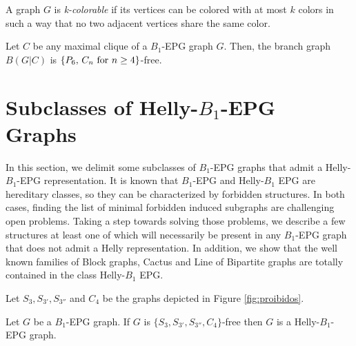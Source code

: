 A graph $G$ is \textit{k-colorable} if its vertices can be colored with at most $k$ colors in such a way that no two adjacent vertices share the same color. 

\begin{lema} \label{l:branch} Let $C$ be any maximal clique of a $B_1$-EPG  graph $G$. Then, the branch graph $B(G|C)$ is $\{P_6, \, C_n \hbox{ for }  n\geq 4\}$-free.
\end{lema}







\section{Subclasses of Helly-$B_1$-EPG Graphs}

In this section, we delimit some  subclasses of $B_1$-EPG graphs that admit a Helly-$B_1$-EPG representation. It is known that $B_1$-EPG and Helly-$B_1$ EPG 
are hereditary classes, so they can  be characterized by forbidden structures. 
In both cases, finding the list of minimal forbidden induced subgraphs are challenging open problems.
Taking a step towards solving
those problems,  we describe a few structures %
at least one of which will  necessarily be present in  any $B_1$-EPG graph that does not admit a Helly representation. 
In addition,
we show that the well known families of Block graphs, Cactus and Line of Bipartite graphs are totally contained in the class Helly-$B_1$ EPG.


Let $S_{3}, S_{3'}, S_{3''}$ and $ C_{4}$ be the graphs depicted in Figure \ref{fig:proibidos}. 


\begin{theorem}
\label{lem:chordalDiamondFree}
Let $G$ be a $B_1$-EPG graph. If $G$ is  $\{S_{3}, S_{3'}, S_{3''}, C_{4}\}$-free then $G$  is a Helly-$B_1$-EPG graph.
\end{theorem}

